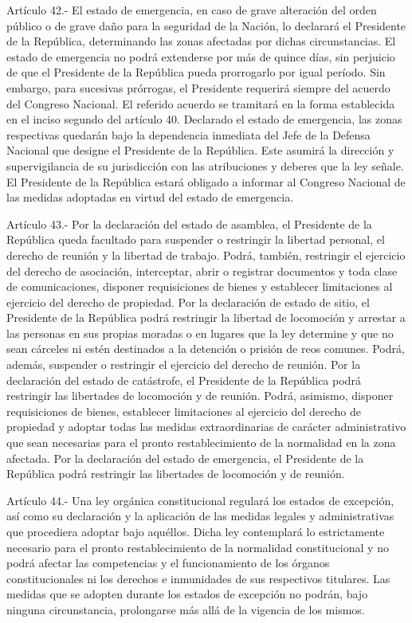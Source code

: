     Artículo 42.- El estado de emergencia, en caso de grave alteración del orden público o de grave daño para la seguridad de la Nación, lo declarará el Presidente de la República, determinando las zonas afectadas por dichas circunstancias. El estado de emergencia no podrá extenderse por más de quince días, sin perjuicio de que el Presidente de la República pueda prorrogarlo por igual período. Sin embargo, para sucesivas prórrogas, el Presidente requerirá siempre del acuerdo del Congreso Nacional. El referido acuerdo se tramitará en la forma establecida en el inciso segundo del artículo 40.
    Declarado el estado de emergencia, las zonas respectivas quedarán bajo la dependencia inmediata del Jefe de la Defensa Nacional que designe el Presidente de la República. Este asumirá la dirección y supervigilancia de su jurisdicción con las atribuciones y deberes que la ley señale.
    El Presidente de la República estará obligado a informar al Congreso Nacional de las medidas adoptadas en virtud del estado de emergencia.



    Artículo 43.- Por la declaración del estado de asamblea, el Presidente de la República queda facultado para suspender o restringir la libertad personal, el derecho de reunión y la libertad de trabajo. Podrá, también, restringir el ejercicio del derecho de asociación, interceptar, abrir o registrar documentos y toda clase de comunicaciones, disponer requisiciones de bienes y establecer limitaciones al ejercicio del derecho de propiedad.
    Por la declaración de estado de sitio, el Presidente de la República podrá restringir la libertad de locomoción y arrestar a las personas en sus propias moradas o en lugares que la ley determine y que no sean cárceles ni estén destinados a la detención o prisión de reos comunes. Podrá, además, suspender o restringir el ejercicio del derecho de reunión.
    Por la declaración del estado de catástrofe, el Presidente de la República podrá restringir las libertades de locomoción y de reunión. Podrá, asimismo, disponer requisiciones de bienes, establecer limitaciones al ejercicio del derecho de propiedad y adoptar todas las medidas extraordinarias de carácter administrativo que sean necesarias para el pronto restablecimiento de la normalidad en la zona afectada.
    Por la declaración del estado de emergencia, el Presidente de la República podrá restringir las libertades de locomoción y de reunión.



    Artículo 44.- Una ley orgánica constitucional regulará los estados de excepción, así como su declaración y la aplicación de las medidas legales y administrativas que procediera adoptar bajo aquéllos. Dicha ley contemplará lo estrictamente necesario para el pronto restablecimiento de la normalidad constitucional y no podrá afectar las competencias y el funcionamiento de los órganos constitucionales ni los derechos e inmunidades de sus respectivos titulares.
    Las medidas que se adopten durante los estados de excepción no podrán, bajo ninguna circunstancia, prolongarse más allá de la vigencia de los mismos.




